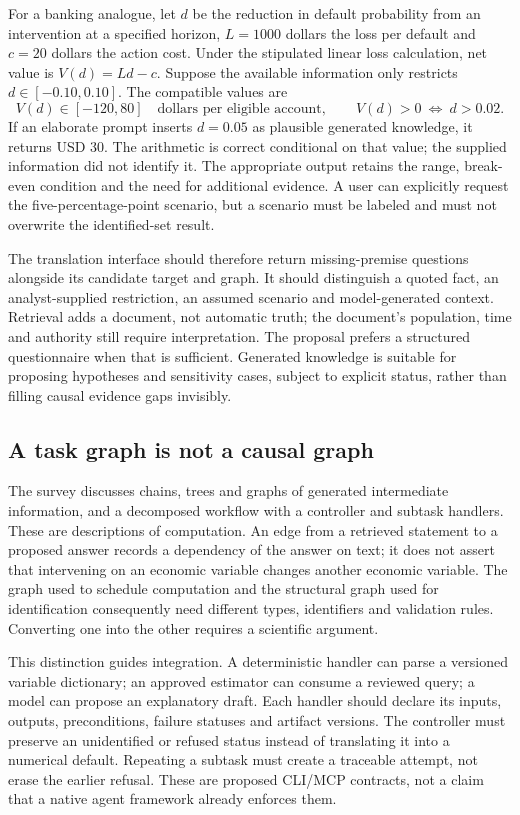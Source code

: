 For a banking analogue, let $d$ be the reduction in default probability from an
intervention at a specified horizon, $L=1000$ dollars the loss per default and
$c=20$ dollars the action cost. Under the stipulated linear loss calculation,
net value is $V(d)=Ld-c$. Suppose the available information only restricts
$d\in[-0.10,0.10]$. The compatible values are
\[
 V(d)\in[-120,80]\quad\text{dollars per eligible account},
 \qquad V(d)>0\ \Longleftrightarrow\ d>0.02.
\]
If an elaborate prompt inserts $d=0.05$ as plausible generated knowledge, it
returns USD 30. The arithmetic is correct conditional on that value; the
supplied information did not identify it. The appropriate output retains the
range, break-even condition and the need for additional evidence. A user can
explicitly request the five-percentage-point scenario, but a scenario must be
labeled and must not overwrite the identified-set result.
\citep{exec24_promptengineering_reference}

The translation interface should therefore return missing-premise questions
alongside its candidate target and graph. It should distinguish a quoted fact,
an analyst-supplied restriction, an assumed scenario and model-generated
context. Retrieval adds a document, not automatic truth; the document's
population, time and authority still require interpretation. The proposal
prefers a structured questionnaire when that is sufficient. Generated knowledge
is suitable for proposing hypotheses and sensitivity cases, subject to explicit
status, rather than filling causal evidence gaps invisibly.

\subsection{A task graph is not a causal graph}

The survey discusses chains, trees and graphs of generated intermediate
information, and a decomposed workflow with a controller and subtask handlers.
These are descriptions of computation. An edge from a retrieved statement to
a proposed answer records a dependency of the answer on text; it does not
assert that intervening on an economic variable changes another economic
variable. The graph used to schedule computation and the structural graph used
for identification consequently need different types, identifiers and
validation rules. Converting one into the other requires a scientific argument.
\citep{exec24_promptengineering_original}

This distinction guides integration. A deterministic handler can parse a
versioned variable dictionary; an approved estimator can consume a reviewed
query; a model can propose an explanatory draft. Each handler should declare its
inputs, outputs, preconditions, failure statuses and artifact versions. The
controller must preserve an unidentified or refused status instead of translating
it into a numerical default. Repeating a subtask must create a traceable attempt,
not erase the earlier refusal. These are proposed CLI/MCP contracts, not a claim
that a native agent framework already enforces them.

